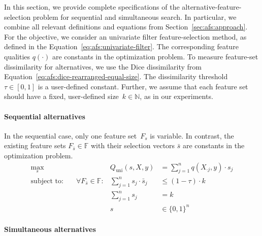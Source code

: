 \documentclass{article}
\theoremstyle{definition}
\begin{document}
In this section, we provide complete specifications of the alternative-feature-selection problem for sequential and simultaneous search.
In particular, we combine all relevant definitions and equations from Section~\ref{sec:afs:approach}.
For the objective, we consider an univariate filter feature-selection method, as defined in the Equation~\ref{eq:afs:univariate-filter}.
The corresponding feature qualities $q(\cdot)$ are constants in the optimization problem.
To measure feature-set dissimilarity for alternatives, we use the Dice dissimilarity from Equation~\ref{eq:afs:dice-rearranged-equal-size}.
The dissimilarity threshold~$\tau \in [0,1]$ is a user-defined constant.
Further, we assume that each feature set should have a fixed, user-defined size~$k \in \mathbb{N}$, as in our experiments.

\paragraph{Sequential alternatives}

In the sequential case, only one feature set~$F_s$ is variable.
In contrast, the existing feature sets $F_{\bar{s}} \in \mathbb{F}$ with their selection vectors $\bar{s}$ are constants in the optimization problem.
%
\begin{equation}
	\begin{aligned}
		\max_s &\quad & Q_{\text{uni}}(s,X,y) &= \sum_{j=1}^{n} q(X_{\cdot{}j},y) \cdot s_j \\
		\text{subject to:} &\quad \forall F_{\bar{s}} \in \mathbb{F}: & \sum_{j=1}^n s_j \cdot \bar{s}_j &\leq (1 - \tau) \cdot k \\
		&\quad & \sum_{j=1}^n s_j &= k \\
		&\quad & s &\in \{0,1\}^n
	\end{aligned}
	\label{eq:afs:afs-sequential-complete}
\end{equation}
%
\paragraph{Simultaneous alternatives}
\end{document}
